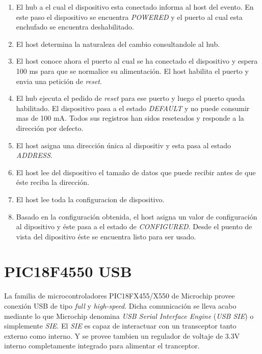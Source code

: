 \begin{enumerate}
 \item El hub a el cual el dispositivo esta conectado informa al host del
evento. En este paso el dispositivo se encuentra \emph{POWERED} y el puerto al
cual esta enchufado se encuentra deshabilitado.
 \item El host determina la naturaleza del cambio consultandole al hub.
 \item El host conoce ahora el puerto al cual se ha conectado el dispositivo y
espera 100 ms para que se normalice su alimentaci\'on. El host habilita el
puerto y envia una petici\'on de \emph{reset}.
 \item El hub ejecuta el pedido de \emph{reset} para ese puerto y luego el
puerto queda habilitado. El dispositivo pasa a el estado \emph{DEFAULT} y no
puede consumir mas de 100 mA. Todos sus registros han sidos reseteados y
responde a la direcci\'on por defecto.
 \item El host asigna una direcci\'on \'unica al dispositiv y esta pasa al
estado \emph{ADDRESS}.
 \item El host lee del dispositivo el tama\~no de datos que puede recibir antes
de que \'este reciba la direcci\'on.
 \item El host lee toda la configuracion de dispositivo.
 \item Basado en la configuraci\'on obtenida, el host asigna un valor de
configuraci\'on al dipositivo y \'este pasa a el estado de \emph{CONFIGURED}.
Desde el puento de vista del dipositivo \'este se encuentra listo para ser
usado.
\end{enumerate}

\section{PIC18F4550 USB}
La familia de microcontroladores PIC18FX455/X550 de Microchip provee
conexi\'on USB de tipo \emph{full} y \emph{high-speed}. Dicha comunicaci\'on
se lleva acabo mediante lo que Microchip denomina \emph{USB Serial Interface
Engine} (\emph{USB SIE}) o simplemente \emph{SIE}. 
El \emph{SIE} es capaz de interactuar con un transceptor tanto externo como
interno. Y se provee tambien un regulador de voltaje de 3.3V interno
completamente integrado para alimentar el tranceptor.


